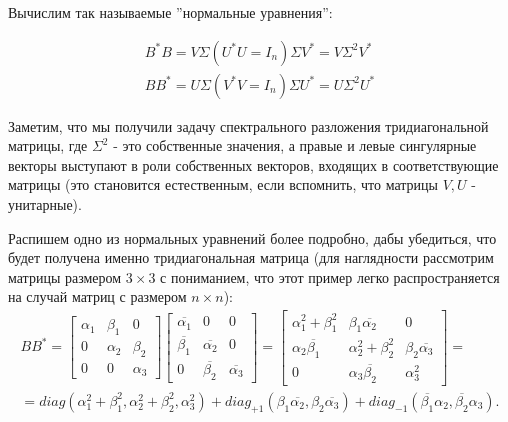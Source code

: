Вычислим так называемые ''нормальные уравнения'':

\begin{equation} \label{Norm_eq}
    \begin{split}
        B^*B=V \Sigma (U^*U=I_n) \Sigma V^*=V \Sigma^2 V^*\\
        BB^*=U\Sigma (V^* V=I_n) \Sigma U^*=U \Sigma^2 U^*
    \end{split}
\end{equation}

Заметим, что мы получили задачу спектрального разложения тридиагональной матрицы, где $\Sigma^2$ - это собственные значения, а правые и левые сингулярные векторы выступают в роли собственных векторов, входящих в соответствующие матрицы (это становится естественным, если вспомнить, что матрицы \(V,U\) - унитарные). 

Распишем одно из нормальных уравнений более подробно, дабы убедиться, что будет получена именно тридиагональная матрица (для наглядности рассмотрим матрицы размером $3\times 3$ с пониманием, что этот пример легко распространяется на случай матриц с размером $n\times n$):
\begin{equation*}
    \begin{split}
        BB^*=\begin{bmatrix}
            \alpha_1 & \beta_1 & 0\\
            0 & \alpha_2 & \beta_2 \\
            0 & 0 & \alpha_3  
        \end{bmatrix}\begin{bmatrix}
            \overline{\alpha_1} & 0 & 0\\
            \overline{\beta_1} & \overline{\alpha_2} & 0 \\
            0 & \overline{\beta_2} & \overline{\alpha_3}  
        \end{bmatrix} =
        \begin{bmatrix}
            \alpha_1^2+\beta^2_1 & \beta_1 \overline{\alpha_2} & 0 \\
            \alpha_2 \overline{\beta_1} & \alpha_2^2+\beta_2^2 & \beta_2 \overline{\alpha_3} \\
            0 & \alpha_3 \overline{\beta_2} & \alpha_3^2
        \end{bmatrix} =\\[6pt]= diag(\alpha_1^2+\beta^2_1, \alpha_2^2+\beta^2_2,\alpha_3^2)+diag_{+1}(\beta_1 \overline{\alpha_2},\beta_2 \overline{\alpha_3})+diag_{-1}(\overline{\beta_1} \alpha_2,\overline{\beta_2} \alpha_3).
    \end{split}
\end{equation*}

